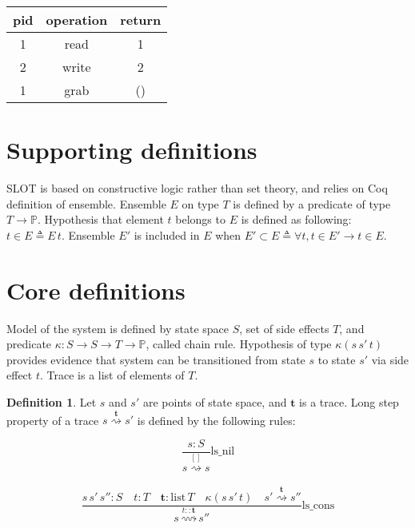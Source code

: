 \documentclass[10pt,letterpaper]{article}
\newcommand \prop{\mathds{P}}
\newcommand \crpred[3]{\mathrel{\kappa\left(#1\,#2\,#3\right)}}
\newcommand \chain[3]{\mathrel{#1\stackrel{#3}{\rightsquigarrow}#2}}
\newcommand \bm[1]{\boldsymbol{#1}}
\theoremstyle{definition}
\newtheorem{definition}{Definition}
\begin{document}
\begin{center}
  \begin{tabular}{ c c c }
    pid & operation & return \\
    \hline
    1 & read & 1 \\
    2 & write & 2 \\
    1 & grab & ()
  \end{tabular}
\end{center}

\section{Supporting definitions}

SLOT is based on constructive logic rather than set theory, and relies
on Coq definition of ensemble. Ensemble $E$ on type $T$ is defined by
a predicate of type $T \to \prop$. Hypothesis that element $t$ belongs
to $E$ is defined as following: $t \in E \triangleq E\, t$. Ensemble
$E'$ is included in $E$ when
$E' \subset E \triangleq \forall t, t \in E' \to t \in E$.

\section{Core definitions}

Model of the system is defined by state space $S$, set of side effects
$T$, and predicate $\mathrel{\kappa:S\to S\to T\to \prop}$, called
chain rule. Hypothesis of type $\crpred{s}{s'}{t}$ provides evidence that
system can be transitioned from state $s$ to state $s'$ via side
effect $t$. Trace is a list of elements of $T$.

\begin{definition}
  Let $s$ and $s'$ are points of state space, and $\bm{t}$ is a trace.
  Long step property of a trace $\chain{s}{s'}{\bm{t}}$ is defined by
  the following rules:

  \begin{equation}
    \frac{s : S}{\chain{s}{s}{[]}} \text{ls\_nil}
  \end{equation}
  \\
  \begin{equation}
    \frac{s\, s' \, s'' : S \quad  t : T \quad \bm{t} : \text{list}\,T \quad \crpred{s}{s'}{t} \quad \chain{s'}{s''}{\bm{t}}}
         {\chain{s}{s''}{t::\bm{t}}}
    \text{ls\_cons}
  \end{equation}
\end{definition}
\end{document}
